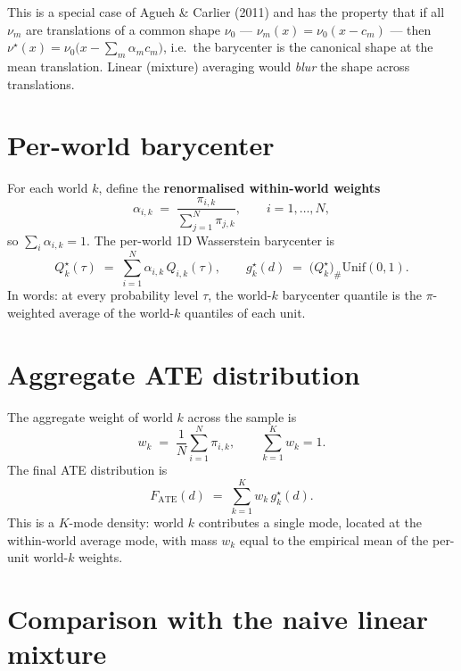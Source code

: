 \documentclass[11pt]{article}
\newcommand{\Unif}{\mathrm{Unif}}
\newcommand{\Fate}{F_{\mathrm{ATE}}}
\begin{document}
This is a special case of Agueh \& Carlier (2011) and has the property that if all $\nu_m$ are translations of a common shape $\nu_0$ --- $\nu_m(x) = \nu_0(x - c_m)$ --- then $\nu^\star(x) = \nu_0\bigl(x - \sum_m \alpha_m c_m\bigr)$, i.e.\ the barycenter is the canonical shape at the mean translation. Linear (mixture) averaging would \emph{blur} the shape across translations.

\section{Per-world barycenter}

For each world $k$, define the \textbf{renormalised within-world weights}
\[
  \alpha_{i,k} \;=\; \frac{\pi_{i,k}}{\sum_{j=1}^{N} \pi_{j,k}}, \qquad i = 1, \dots, N,
\]
so $\sum_i \alpha_{i,k} = 1$. The per-world 1D Wasserstein barycenter is
\begin{equation}
  \boxed{\;Q_k^\star(\tau) \;=\; \sum_{i=1}^{N} \alpha_{i,k}\, Q_{i,k}(\tau),
  \qquad g_k^\star(d) \;=\; \bigl(Q_k^\star\bigr)_\# \Unif(0,1).\;}
  \label{eq:perworld-bary}
\end{equation}
In words: at every probability level $\tau$, the world-$k$ barycenter quantile is the $\pi$-weighted average of the world-$k$ quantiles of each unit.

\section{Aggregate ATE distribution}

The aggregate weight of world $k$ across the sample is
\[
  w_k \;=\; \frac{1}{N}\sum_{i=1}^{N} \pi_{i,k}, \qquad \sum_{k=1}^{K} w_k = 1.
\]
The final ATE distribution is
\begin{equation}
  \boxed{\;\Fate(d) \;=\; \sum_{k=1}^{K} w_k\, g_k^\star(d).\;}
  \label{eq:fate}
\end{equation}
This is a $K$-mode density: world $k$ contributes a single mode, located at the within-world average mode, with mass $w_k$ equal to the empirical mean of the per-unit world-$k$ weights.

\section{Comparison with the naive linear mixture}
\end{document}
